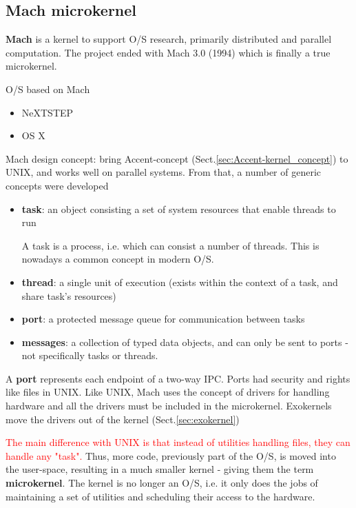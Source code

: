\subsection{Mach microkernel}
\label{sec:Mach_kernel}

{\bf Mach} is a kernel to support O/S research, primarily distributed
and parallel computation. The project ended with Mach 3.0 (1994)
which is finally a true microkernel.

O/S based on Mach
\begin{itemize}
  \item NeXTSTEP
  \item OS X
\end{itemize}

Mach design concept: bring Accent-concept
(Sect.\ref{sec:Accent-kernel_concept}) to UNIX, and works well on parallel
systems. From that, a number of generic concepts were developed
\begin{itemize}
  \item {\bf task}: an object consisting a set of system resources that enable
  threads to run
  
  A task is a process, i.e. which can consist a number of threads. 
  This is nowadays a common concept in modern O/S.
  
  \item {\bf thread}: a single unit of execution (exists within the context of a task, 
  and share task's resources)
  
  \item {\bf port}: a protected message queue for communication between tasks
  
  \item {\bf messages}: a collection of typed data objects, and can only be sent to ports
  - not specifically tasks or threads.
\end{itemize}
A {\bf port} represents each endpoint of a two-way IPC. Ports had security and rights 
like files in UNIX. Like UNIX, Mach uses the concept of drivers for handling hardware
and all the drivers must be included in the microkernel. Exokernels move the drivers
out of the kernel (Sect.\ref{sec:exokernel})

\textcolor{red}{The main difference with UNIX is that instead of utilities handling files, they
can handle any "task".} Thus, more code, previously part of the O/S, is moved into the user-space,
resulting in a much smaller kernel - giving them the term {\bf microkernel}.
The kernel is no longer an O/S, i.e. it only does the jobs of maintaining a
set of utilities and scheduling their access to the hardware.


